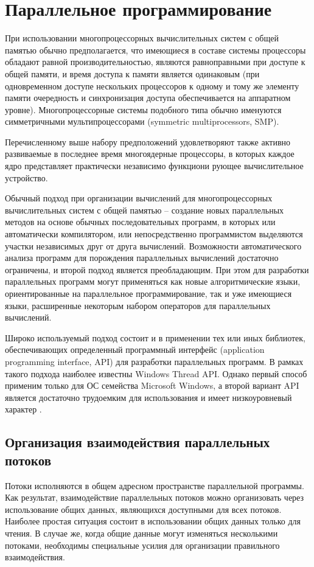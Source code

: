 \documentclass[12pt]{report}
\begin{document}
\section{Параллельное программирование}

При использовании многопроцессорных вычислительных систем с общей памятью обычно предполагается, что имеющиеся в составе системы процессоры обладают равной производительностью, являются равноправными при доступе к общей памяти, и время доступа к памяти является одинаковым (при одновременном доступе нескольких процессоров к одному и тому же элементу памяти очередность и синхронизация доступа обеспечивается на аппаратном уровне). Многопроцессорные системы подобного типа обычно именуются симметричными мультипроцессорами (symmetric multiprocessors, SMP).

Перечисленному выше набору предположений удовлетворяют также активно развиваемые в последнее время многоядерные процессоры, в которых каждое ядро представляет практически независимо функциони рующее вычислительное устройство.

Обычный подход при организации вычислений для многопроцессорных вычислительных систем с общей памятью – создание новых параллельных методов на основе обычных последовательных программ, в которых или автоматически компилятором, или непосредственно программистом выделяются участки независимых друг от друга вычислений. Возможности автоматического анализа программ для порождения параллельных вычислений достаточно ограничены, и второй подход является преобладающим. При этом для разработки параллельных программ могут применяться как новые алгоритмические языки, ориентированные на параллельное программирование, так и уже имеющиеся языки, расширенные некоторым набором операторов для параллельных вычислений.

Широко используемый подход состоит и в применении тех или иных библиотек, обеспечивающих определенный программный интерфейс (application programming interface, API) для разработки параллельных программ. В рамках такого подхода наиболее известны Windows Thread API. Однако первый способ применим только для ОС семейства Microsoft Windows, а второй вариант API является достаточно трудоемким для использования и имеет низкоуровневый характер \cite{Barkalov}.

\subsection{Организация взаимодействия параллельных потоков}
Потоки исполняются в общем адресном пространстве параллельной программы. Как результат, взаимодействие параллельных потоков можно организовать через использование общих данных, являющихся доступными для всех потоков. Наиболее простая ситуация состоит в использовании общих данных только для чтения. В случае же, когда общие данные могут изменяться несколькими потоками, необходимы специальные усилия для организации правильного взаимодействия.
\end{document}
